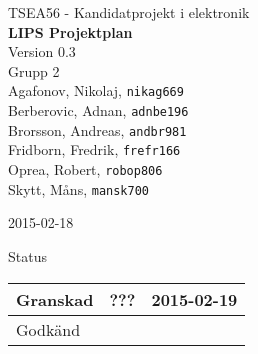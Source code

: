\documentclass[11pt]{article}
\date{}
\begin{document}
\begin{titlepage}
\begin{center}
TSEA56 - Kandidatprojekt i elektronik \\[0.5in]
{\Large\bfseries LIPS Projektplan}\\
%
\vspace{4\baselineskip}
%
Version 0.3\\
\vspace{2\baselineskip}
%
Grupp 2 \\
Agafonov, Nikolaj, 
\texttt{nikag669}
\\
Berberovic, Adnan, 
\texttt{adnbe196}
\\
Brorsson, Andreas, 
\texttt{andbr981}
\\
Fridborn, Fredrik, 
\texttt{frefr166}
\\
Oprea, Robert, 
\texttt{robop806}
\\
Skytt, Måns, 
\texttt{mansk700}

\vspace{2\baselineskip}
2015-02-18

\vspace{19\baselineskip}
Status
\begin{longtable}{|l|l|l|} \hline

Granskad &
??? & 
2015-02-19 \\ \hline
Godkänd &
 &
 \\ \hline
 
\end{longtable}

\end{center}
\end{titlepage}
\end{document}
